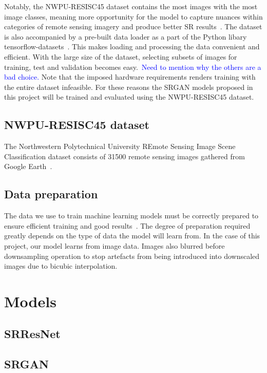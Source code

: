Notably, the NWPU-RESISC45 dataset contains the most images with the most image classes, meaning more opportunity for the model to capture nuances within categories of remote sensing imagery and produce better SR results~\cite{ref}. The dataset is also accompanied by a pre-built data loader as a part of the Python libary tensorflow-datasets~\cite{ref}. This makes loading and processing the data convenient and efficient. With the large size of the dataset, selecting subsets of images for training, test and validation becomes easy.\ \textcolor{blue}{Need to mention why the others are a bad choice.} Note that the imposed hardware requirements renders training with the entire dataset infeasible. For these reasons the SRGAN models proposed in this project will be trained and evaluated using the NWPU-RESISC45 dataset.

\subsection{NWPU-RESISC45 dataset}
The Northwestern Polytechnical University REmote Sensing Image Scene Classification dataset consists of 31500 remote sensing images gathered from Google Earth~\cite{resisc45}. 

\subsection{Data preparation}
The data we use to train machine learning models must be correctly prepared to ensure efficient training and good results~\cite{ref}. The degree of preparation required greatly depends on the type of data the model will learn from. In the case of this project, our model learns from image data. Images also blurred before downsampling operation to stop artefacts from being introduced into downscaled images due to bicubic interpolation.

\section{Models}

\subsection{SRResNet}

\subsection{SRGAN}

